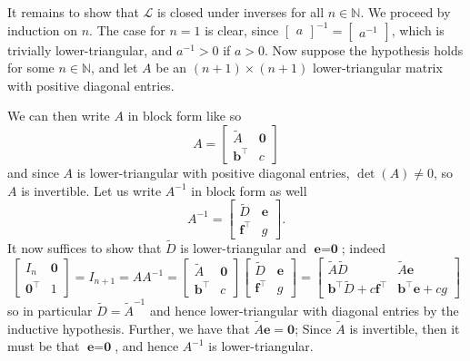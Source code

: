 \documentclass{../../../kin_math}
\begin{document}
\begin{questions}
\begin{enumerate}
\begin{solution}
      It remains to show that $\mathcal{L}$ is closed under inverses for all $n \in \mathbb{N}$. We proceed by induction on $n$. The case for $n = 1$ is clear, since $\begin{bmatrix} a \end{bmatrix}^{-1} = \begin{bmatrix} a^{-1} \end{bmatrix}$, which is trivially lower-triangular, and $a^{-1} > 0$ if $a > 0$. Now suppose the hypothesis holds for some $n \in \mathbb{N}$, and let $A$ be an $(n + 1) \times (n + 1)$ lower-triangular matrix with positive diagonal entries.

      We can then write $A$ in block form like so
      \begin{equation*}
        A = \begin{bmatrix} \tilde{A} & \textbf{0} \\ \textbf{b}^\top & c \end{bmatrix}
      \end{equation*}
      and since $A$ is lower-triangular with positive diagonal entries, $\det(A) \neq 0$, so $A$ is invertible. Let us write $A^{-1}$ in block form as well
      \begin{equation*}
        A^{-1} = \begin{bmatrix} \tilde{D} & \textbf{e} \\ \textbf{f}^\top & g \end{bmatrix}.
      \end{equation*}
      It now suffices to show that $\tilde{D}$ is lower-triangular and $\textbf{e} = \textbf{0}$; indeed
      \begin{equation*}
        \begin{bmatrix} I_n & \textbf{0} \\ \textbf{0}^\top & 1 \end{bmatrix} = I_{n + 1} = AA^{-1} = \begin{bmatrix} \tilde{A} & \textbf{0} \\ \textbf{b}^\top & c \end{bmatrix} \begin{bmatrix} \tilde{D} & \textbf{e} \\ \textbf{f}^\top & g \end{bmatrix} = \begin{bmatrix} \tilde{A} \tilde{D} & \tilde{A} \textbf{e} \\ \textbf{b}^\top \tilde{D} + c \textbf{f}^\top & \textbf{b}^\top \textbf{e} + cg \end{bmatrix}
      \end{equation*}
      so in particular $\tilde{D} = \tilde{A}^{-1}$ and hence lower-triangular with diagonal entries by the inductive hypothesis. Further, we have that $\tilde{A} \textbf{e} = \textbf{0}$; Since $\tilde{A}$ is invertible, then it must be that $\textbf{e} = \textbf{0}$, and hence $A^{-1}$ is lower-triangular.


\end{solution}
\end{enumerate}
\end{questions}
\end{document}

